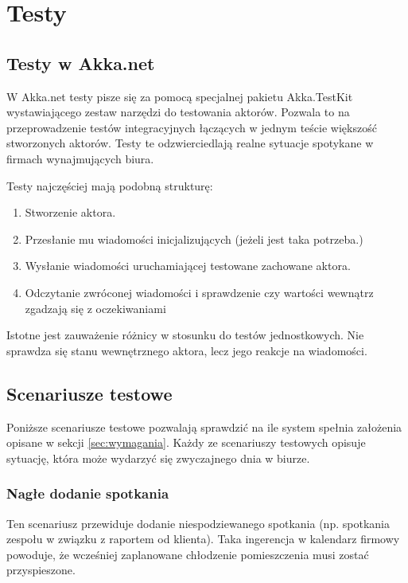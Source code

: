 \chapter{Testy}
\section{Testy w Akka.net}
W Akka.net testy pisze się za pomocą specjalnej pakietu Akka.TestKit wystawiającego zestaw narzędzi do testowania aktorów. Pozwala to na 
przeprowadzenie testów integracyjnych łączących w jednym teście większość stworzonych aktorów. Testy te odzwierciedlają realne sytuacje spotykane w firmach wynajmujących biura. 

Testy najczęściej mają podobną strukturę:
\begin{enumerate}
    \item Stworzenie aktora.
    \item Przesłanie mu wiadomości inicjalizujących (jeżeli jest taka potrzeba.)
    \item Wysłanie wiadomości uruchamiającej testowane zachowane aktora.
    \item Odczytanie zwróconej wiadomości i sprawdzenie czy wartości wewnątrz zgadzają się z oczekiwaniami
\end{enumerate}
Istotne jest zauważenie różnicy w stosunku do testów jednostkowych. Nie sprawdza się stanu wewnętrznego aktora, lecz jego reakcje na wiadomości.

\section{Scenariusze testowe}
Poniższe scenariusze testowe pozwalają sprawdzić na ile system spełnia założenia opisane w sekcji \ref{sec:wymagania}. Każdy ze scenariuszy testowych opisuje sytuację, która może wydarzyć się zwyczajnego dnia w biurze.

\subsection{Nagłe dodanie spotkania}
Ten scenariusz przewiduje dodanie niespodziewanego spotkania (np. spotkania zespołu w związku z raportem od klienta). Taka ingerencja w kalendarz firmowy powoduje, że wcześniej zaplanowane chłodzenie pomieszczenia musi zostać przyspieszone. 

